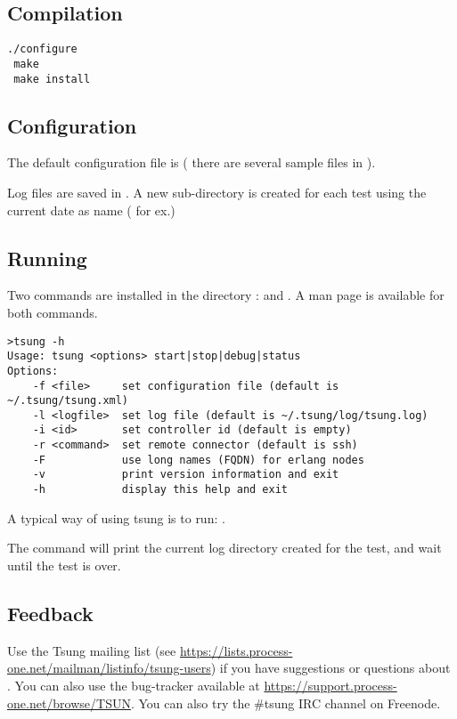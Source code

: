 \documentclass{TSUNG-en}
\begin{document}
\subsection{Compilation}

\begin{Verbatim}
./configure
 make
 make install
\end{Verbatim}
\subsection{Configuration}

The default configuration file is  (
there are several sample files in
).

Log files are saved in  . A new sub-directory
is created for each test using the current date as name
( for ex.)

\subsection{Running}

Two commands are installed in the directory :
 and . A man page is available
for both commands.

\begin{Verbatim}
>tsung -h
Usage: tsung <options> start|stop|debug|status
Options:
    -f <file>     set configuration file (default is ~/.tsung/tsung.xml)
    -l <logfile>  set log file (default is ~/.tsung/log/tsung.log)
    -i <id>       set controller id (default is empty)
    -r <command>  set remote connector (default is ssh)
    -F            use long names (FQDN) for erlang nodes
    -v            print version information and exit
    -h            display this help and exit
\end{Verbatim}

A typical way of using tsung is to run:
.

The command will print the current log directory created for the test, and wait until the test is
over.

\subsection{Feedback}

Use the Tsung mailing list (see
\url{https://lists.process-one.net/mailman/listinfo/tsung-users}) if you have
suggestions or questions about . You can also use the
bug-tracker available at \url{https://support.process-one.net/browse/TSUN}.
You can also try the \#tsung IRC channel on Freenode.
\end{document}
